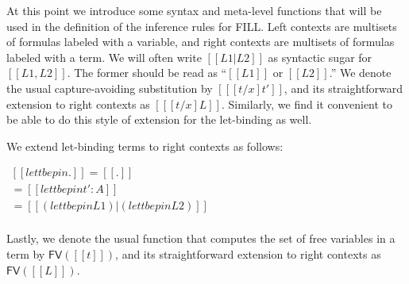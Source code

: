 At this point we introduce some syntax and meta-level functions that
will be used in the definition of the inference rules for FILL. Left
contexts are multisets of formulas labeled with a variable, and right
contexts are multisets of formulas labeled with a term.  We will often
write $[[L1 | L2]]$ as syntactic sugar for $[[L1,L2]]$.  The former
should be read as ``$[[L1]]$ or $[[L2]]$.''  We denote the usual
capture-avoiding substitution by $[[ [t/x]t']]$, and its
straightforward extension to right contexts as $[[ [t/x]L]]$.
Similarly, we find it convenient to be able to do this style of
extension for the let-binding as well.
\begin{definition}
  \label{def:delta-let}
  We extend let-binding terms to right contexts as follows:
  \begin{center}
    \begin{math}
      \begin{array}{lll}
        [[ let t be p in .]] = [[.]]\\
        [[ let t be p in (t' : A)]] = [[{let t be p in t'} : A]]\\
        [[ let t be p in (L1 | L2)]] = [[(let t be p in L1) | (let t be p in L2)]]\\
      \end{array}
    \end{math}
  \end{center}
\end{definition}
\noindent
Lastly, we denote the usual function that computes the set of free
variables in a term by $\mathsf{FV}([[t]])$, and its straightforward
extension to right contexts as $\mathsf{FV}([[L]])$.
